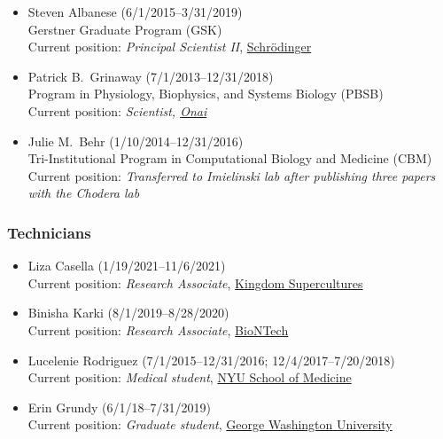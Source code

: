 \documentclass[10pt]{article}
\begin{document}
\begin{itemize}
  \item Steven Albanese (6/1/2015--3/31/2019)\\
  Gerstner Graduate Program (GSK)\\
  Current position: \emph{Principal Scientist II},  \href{http://www.schrodinger.com}{{Schr\"{o}dinger}}
  
  \item Patrick B.~Grinaway (7/1/2013--12/31/2018)\\
  Program in Physiology, Biophysics, and Systems Biology (PBSB)\\
  Current position: \emph{Scientist, \href{https://www.onai.com}{Onai}}

  \item Julie M.~Behr (1/10/2014--12/31/2016)\\
  Tri-Institutional Program in Computational Biology and Medicine (CBM)\\
  Current position: \emph{Transferred to Imielinski lab after publishing three papers with the Chodera lab} 

\end{itemize}
  
\subsubsection*{Technicians}

\begin{itemize}

  \item Liza Casella (1/19/2021--11/6/2021)\\
  Current position: \emph{Research Associate}, \href{https://www.kingdomsupercultures.com/}{Kingdom Supercultures}
  
  \item Binisha Karki (8/1/2019--8/28/2020)\\
  Current position: \emph{Research Associate}, \href{http://biontech.de}{BioNTech}

  \item Lucelenie Rodriguez (7/1/2015--12/31/2016; 12/4/2017--7/20/2018)\\
  Current position: \emph{Medical student}, \href{https://med.nyu.edu/education}{NYU School of Medicine}

  \item Erin Grundy (6/1/18--7/31/2019)\\
  Current position: \emph{Graduate student}, \href{https://smhs.gwu.edu/ibs/program/microbio-immunology}{George Washington University}
\end{itemize}
\end{document}

